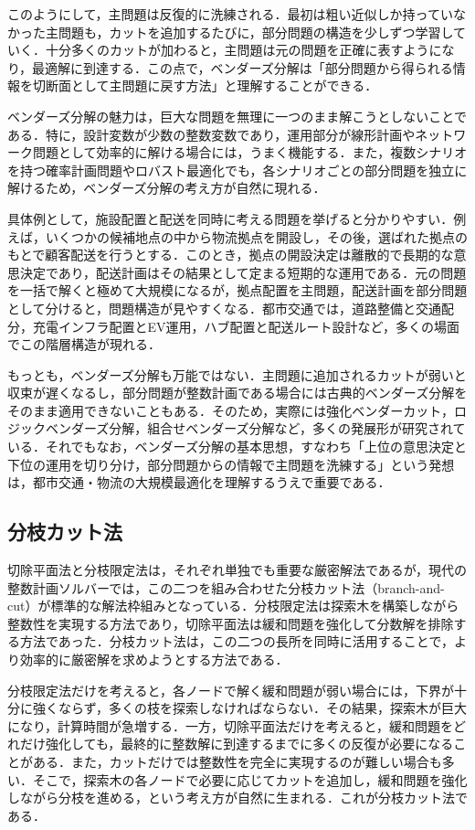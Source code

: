 このようにして，主問題は反復的に洗練される．最初は粗い近似しか持っていなかった主問題も，カットを追加するたびに，部分問題の構造を少しずつ学習していく．十分多くのカットが加わると，主問題は元の問題を正確に表すようになり，最適解に到達する．この点で，ベンダーズ分解は「部分問題から得られる情報を切断面として主問題に戻す方法」と理解することができる．

ベンダーズ分解の魅力は，巨大な問題を無理に一つのまま解こうとしないことである．特に，設計変数が少数の整数変数であり，運用部分が線形計画やネットワーク問題として効率的に解ける場合には，うまく機能する．また，複数シナリオを持つ確率計画問題やロバスト最適化でも，各シナリオごとの部分問題を独立に解けるため，ベンダーズ分解の考え方が自然に現れる．

具体例として，施設配置と配送を同時に考える問題を挙げると分かりやすい．例えば，いくつかの候補地点の中から物流拠点を開設し，その後，選ばれた拠点のもとで顧客配送を行うとする．このとき，拠点の開設決定は離散的で長期的な意思決定であり，配送計画はその結果として定まる短期的な運用である．元の問題を一括で解くと極めて大規模になるが，拠点配置を主問題，配送計画を部分問題として分けると，問題構造が見やすくなる．都市交通では，道路整備と交通配分，充電インフラ配置とEV運用，ハブ配置と配送ルート設計など，多くの場面でこの階層構造が現れる．

もっとも，ベンダーズ分解も万能ではない．主問題に追加されるカットが弱いと収束が遅くなるし，部分問題が整数計画である場合には古典的ベンダーズ分解をそのまま適用できないこともある．そのため，実際には強化ベンダーカット，ロジックベンダーズ分解，組合せベンダーズ分解など，多くの発展形が研究されている．それでもなお，ベンダーズ分解の基本思想，すなわち「上位の意思決定と下位の運用を切り分け，部分問題からの情報で主問題を洗練する」という発想は，都市交通・物流の大規模最適化を理解するうえで重要である．

\subsection{分枝カット法}

切除平面法と分枝限定法は，それぞれ単独でも重要な厳密解法であるが，現代の整数計画ソルバーでは，この二つを組み合わせた分枝カット法（branch-and-cut）が標準的な解法枠組みとなっている\cite{HERNANDEZPEREZ2004126}．分枝限定法は探索木を構築しながら整数性を実現する方法であり，切除平面法は緩和問題を強化して分数解を排除する方法であった．分枝カット法は，この二つの長所を同時に活用することで，より効率的に厳密解を求めようとする方法である．

分枝限定法だけを考えると，各ノードで解く緩和問題が弱い場合には，下界が十分に強くならず，多くの枝を探索しなければならない．その結果，探索木が巨大になり，計算時間が急増する．一方，切除平面法だけを考えると，緩和問題をどれだけ強化しても，最終的に整数解に到達するまでに多くの反復が必要になることがある．また，カットだけでは整数性を完全に実現するのが難しい場合も多い．そこで，探索木の各ノードで必要に応じてカットを追加し，緩和問題を強化しながら分枝を進める，という考え方が自然に生まれる．これが分枝カット法である．

